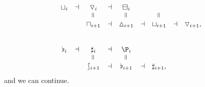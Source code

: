 \documentclass[a4paper]{memoir}
\begin{document}
\begin{example}
\begin{itemize}
\begin{itemize}
\begin{itemize}
\[\begin{array}{c c c c c c c c c}
						\cohfget_i
						&\dashv&
						\cohcodisc_i
						&\dashv&
						\cohcopi_i
						&&
						\\
						&&
						\rotatebox{90}{$=$}
						&&
						\rotatebox{90}{$=$}
						&&
						\rotatebox{90}{$=$}
						&&
						\\
						&&
						\cohpi_{i+1}
						&\dashv&
						\cohdisc_{i+1}
						&\dashv&
						\cohfget_{i+1}
						&\dashv&
						\cohcodisc_{i+1},
						\\
						\phantom{a}
						\\
						\phantom{a}
						\\
						\flat_i
						&\dashv&
						\sharp_i
						&\dashv&
						\coshp_i
						\\
						&&
						\rotatebox{90}{$=$}
						&&
						\rotatebox{90}{$=$}
						&&
						\\
						&&
						\shp_{i+1}
						&\dashv&
						\flat_{i+1}
						&\dashv&
						\sharp_{i+1},
					\end{array}
				\]
				and we can continue.
			\end{itemize}
		\end{itemize}
	\end{itemize}
\end{example}
\end{document}
